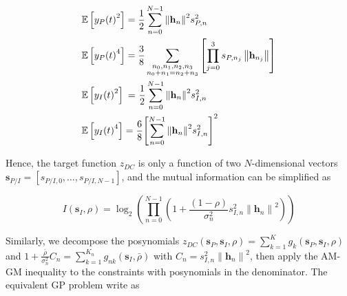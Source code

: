 \begin{equation}\label{eqn:decoupled_terms}
\begin{gathered}
  \mathbb{E}\left[ {{y_P}{{(t)}^2}} \right] = \frac{1}{2}\sum\limits_{n = 0}^{N - 1} {{{\left\| {{{\mathbf{h}}_n}} \right\|}^2}} s_{P,n}^2 \hfill \\
  \mathbb{E}\left[ {{y_P}{{(t)}^4}} \right] = \frac{3}{8}\sum\limits_{\substack{ {n_0},{n_1},{n_2},{n_3} \\ {n_0} + {n_1} = {n_2} + {n_3} }}  {\left[ {\prod\limits_{j = 0}^3 {{s_{P,{n_j}}}} \left\| {{{\mathbf{h}}_{{n_j}}}} \right\|} \right]}  \hfill \\
  \mathbb{E}\left[ {{y_I}{{(t)}^2}} \right]{\text{ = }}\frac{1}{2}\sum\limits_{n = 0}^{N - 1} {{{\left\| {{{\mathbf{h}}_n}} \right\|}^2}} s_{I,n}^2 \hfill \\
  \mathbb{E}\left[ {{y_I}{{(t)}^4}} \right] = \frac{6}{8}{\left[ {\sum\limits_{n = 0}^{N - 1} {{{\left\| {{{\mathbf{h}}_n}} \right\|}^2}} s_{I,n}^2} \right]^2} \hfill \\
\end{gathered}
\end{equation}

Hence, the target function ${z_{DC}}$ is only a function of two $N$-dimensional vectors ${{\mathbf{s}}_{P/I}} = \left[ {{s_{P/I,0}}, \ldots ,{s_{P/I,N - 1}}} \right]$, and the mutual information can be simplified as

\begin{equation}\label{eqn:decoupled_mutual_information}
  I\left( {{{\mathbf{s}}_I},\rho } \right) = {\log _2}\left( {\prod\limits_{n = 0}^{N - 1} {\left( {1 + \frac{{(1 - \rho )}}{{\sigma _n^2}}s_{I,n}^2{{\left\| {{{\mathbf{h}}_n}} \right\|}^2}} \right)} } \right)
\end{equation}

Similarly, we decompose the posynomials ${z_{DC}}\left( {{{\mathbf{s}}_P},{{\mathbf{s}}_I},\rho } \right) = \sum\limits_{k = 1}^K {{g_k}} \left( {{{\mathbf{s}}_P},{{\mathbf{s}}_I},\rho } \right)$ and $1 + \frac{{\bar \rho }}{{\sigma _n^2}}{C_n} = \sum\limits_{k = 1}^{{K_n}} {{g_{nk}}} \left( {{{\mathbf{s}}_I},\bar \rho } \right)$ with ${C_n} = s_{I,n}^2{\left\| {{{\mathbf{h}}_n}} \right\|^2}$, then apply the AM-GM inequality to the constraints with posynomials in the denominator. The equivalent GP problem write as

